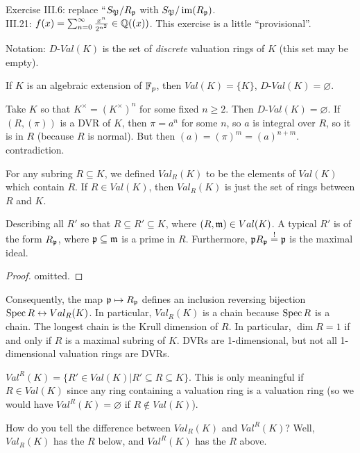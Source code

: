  Exercise III.6: replace ``$S_\mathfrak{P}/R_{\mathfrak{p}}$ with $S_\mathfrak{P}/\operatorname{im} (R_{\mathfrak{p}})$.\\
 III.21: $f(x) = \sum_{n=0}^\infty \frac{x^n}{2^{n^2}} \in \mathbb{Q}((x))$. This exercise is a
 little ``provisional''.

 Notation: $D$-$Val(K)$ is the set of \emph{discrete} valuation rings of $K$ (this set
 may be empty).
 \begin{example}
   If $K$ is an algebraic extension of $\mathbb{F}_p$, then $Val(K)=\{K\}$,
   $D$-$Val(K)=\varnothing$.
 \end{example}
 \begin{example}
   Take $K$ so that $K^\times = (K^\times)^n$ for some fixed $n\ge 2$. Then
   $D$-$Val(K)=\varnothing$. If $(R,(\pi))$ is a DVR of $K$, then $\pi=a^n$ for some $n$,
   so $a$ is integral over $R$, so it is in $R$ (because $R$ is normal). But then
   $(a)=(\pi)^m = (a)^{n+m}$. contradiction.
 \end{example}

 For any subring $R\subseteq K$, we defined $Val_R(K)$ to be the elements of $Val(K)$
 which contain $R$. If $R\in Val(K)$, then $Val_R(K)$ is just the set of rings between
 $R$ and $K$.

 \begin{theorem}[4.12]
   Describing all $R'$ so that $R\subseteq R'\subseteq K$, where $(R,\mathfrak{m})\in Val(K)$. A
   typical $R'$ is of the form $R_{\mathfrak{p}}$, where $\mathfrak{p}\subseteq \mathfrak{m}$ is a prime in
   $R$. Furthermore, $\mathfrak{p} R_{\mathfrak{p}} \overset{!}{=} \mathfrak{p}$ is the maximal ideal.
 \end{theorem}
 \begin{proof}
   omitted.\anton{}
 \end{proof}
 Consequently, the map $\mathfrak{p}\mapsto R_{\mathfrak{p}}$ defines an inclusion reversing bijection $\operatorname{Spec} R
 \leftrightarrow Val_R(K)$. In particular, $Val_R(K)$ is a chain because $\operatorname{Spec} R$ is a
 chain. The longest chain is the Krull dimension of $R$. In particular, $\dim R=1$ if and
 only if $R$ is a maximal subring of $K$. DVRs are 1-dimensional, but not all
 1-dimensional valuation rings are DVRs.

 \begin{definition}
   $Val^R(K) = \{R' \in Val(K)| R'\subseteq R\subseteq K\}$. This is only meaningful if
   $R\in Val(K)$ since any ring containing a valuation ring is a valuation ring (so we
   would have $Val^R(K)=\varnothing$ if $R\not\in Val(K)$).
 \end{definition}
 How do you tell the difference between $Val_R(K)$ and $Val^R(K)$? Well, $Val_R(K)$ has
 the $R$ below, and $Val^R(K)$ has the $R$ above.

